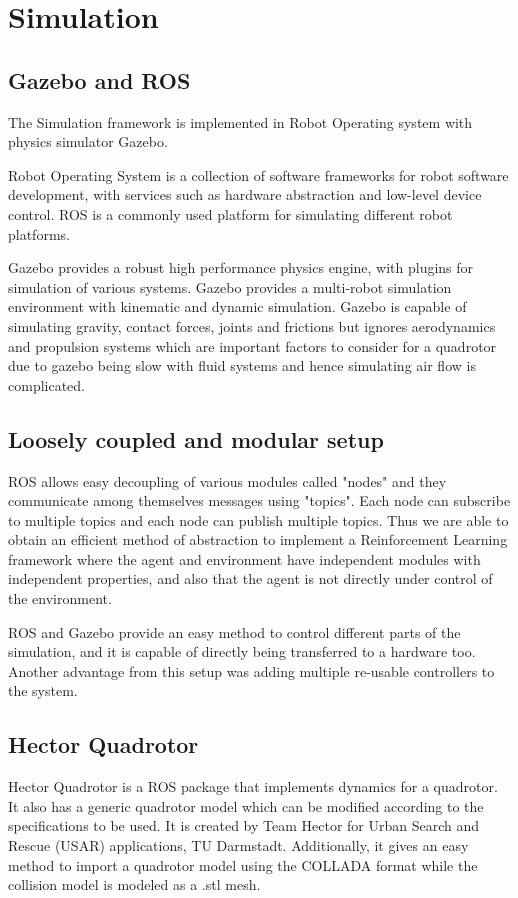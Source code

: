 \documentclass[hidelinks,BTech]{iitmdiss}
\begin{document}
\chapter{Simulation}

\section{Gazebo and ROS}
The Simulation framework is implemented in Robot Operating system \cite{ROS} with physics simulator Gazebo\cite{Gazebo}. 

Robot Operating System is a collection of software frameworks for robot software development, with services such as hardware abstraction and low-level device control. ROS is a commonly used platform for simulating different robot platforms.

Gazebo provides a robust high performance physics engine, with plugins for simulation of various systems. Gazebo provides a multi-robot simulation environment with kinematic and dynamic simulation. Gazebo is capable of simulating gravity, contact forces, joints and frictions but ignores aerodynamics and propulsion systems which are important factors to consider for a quadrotor due to gazebo being slow with fluid systems and hence simulating air flow is complicated.

\section{Loosely coupled and modular setup}
ROS allows easy decoupling of various modules called "nodes" and they communicate among themselves messages using "topics". Each node can subscribe to multiple topics and each node can publish multiple topics. Thus we are able to obtain an efficient method of abstraction to implement a Reinforcement Learning framework where the agent and environment have independent modules with independent properties, and also that the agent is not directly under control of the environment.

ROS and Gazebo provide an easy method to control different parts of the simulation, and it is capable of directly being transferred to a hardware too. Another advantage from this setup was adding multiple re-usable controllers to the system.

\section{Hector Quadrotor}
Hector Quadrotor \cite{HectorQuadrotor} is a ROS package that implements dynamics for a quadrotor. It also has a generic quadrotor model which can be modified according to the specifications to be used. It is created by Team Hector for Urban Search and Rescue (USAR) applications, TU Darmstadt. Additionally, it gives an easy method to import a quadrotor model using the COLLADA format while the collision model is modeled as a .stl mesh.
\end{document}
